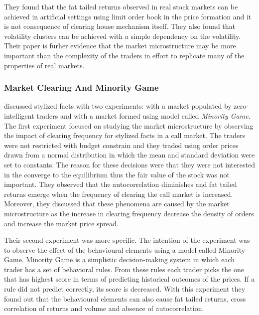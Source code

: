 They found that the fat tailed returns observed in
real stock markets can be achieved in artificial settings using limit 
order book in the price formation and it is not consequence of clearing 
house mechanism itself. They also found that volatility clusters can
be achieved with a simple dependency on the volatility. Their paper
is furher evidence that the market microstructure may be more
important than the complexity of the traders in effort to replicate
many of the properties of real markets.

\subsubsection{Market Clearing And Minority Game}

\citet{LIU20082535} discussed stylized facts with two experiments: with
a market populated by zero-intelligent traders and with a market formed using 
model called \textit{Minority Game}. The first experiment focused on studying
the market microstructure by observing the impact of clearing frequency for 
stylized facts in a call market. The traders were not restricted with budget 
constrain and they traded using order prices drawn from a normal distribution 
in which the mean and standard deviation were set to constants. The reason 
for these decisions were that they were not interested in the converge to 
the equilibrium thus the fair value of the stock was not important. They 
observed that the autocorrelation diminishes and fat tailed returns emerge 
when the frequency of clearing the call market is increased. Moreover,
they discussed that these phenomena are caused by the market microstructure
as the increase in clearing frequency decrease the density of orders and 
increase the market price spread.

Their second experiment was more specific. The intention of the experiment 
was to observe the effect of the behavioural elements using a model called
Minority Game. Minority Game is a simplistic decision-making system in
which each trader has a set of behavioral rules. From these rules each
trader picks the one that has highest score in terms of predicting 
historical outcomes of the prices. If a rule did not predict correctly,
its score is decreased. With this experiment they found out that the
behavioural elements can also cause fat tailed returns, cross correlation 
of returns and volume and absence of autocorrelation.
